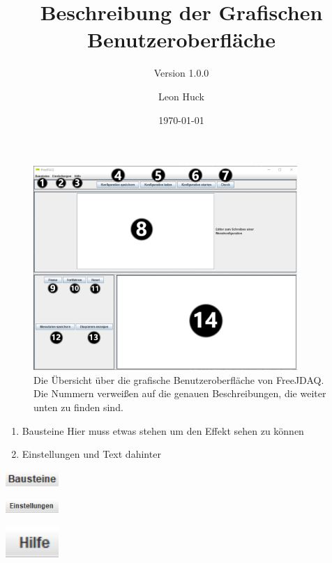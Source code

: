 \documentclass[parskip=full]{scrartcl}
\title{Beschreibung der Grafischen Benutzeroberfläche}
\subtitle{Version 1.0.0}
\author{Leon Huck}
\date{\today}
\begin{document}

\begin{figure}[htbp]
    \begin{center}
        \includegraphics[width = 10cm]{Grafiken/Uebersicht_GUI_Mit_Nummern.png}
        \caption{Die Übersicht über die grafische Benutzeroberfläche von FreeJDAQ. Die Nummern verweißen auf die genauen Beschreibungen, die weiter unten zu finden sind.}
        \label{Uebersicht_GUI_Mit_Nummern}
    \end{center}
\end{figure}

\begin{enumerate}
    \item Bausteine
    Hier muss etwas stehen um den Effekt sehen zu k{\"o}nnen
    \item Einstellungen und Text dahinter
\end{enumerate}

\begin{flushleft}
    \includegraphics[width = 2cm]{Grafiken/1-Bausteine.png}
\end{flushleft}

\begin{flushleft}
    \includegraphics[width = 2cm]{Grafiken/2-Einstellungen.png}
\end{flushleft}

\begin{flushleft}
    \includegraphics[width = 2cm]{Grafiken/3-Hilfe.png}
\end{flushleft}
\end{document}
